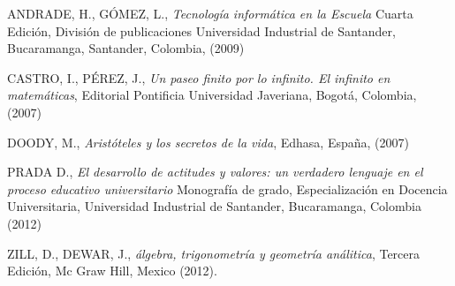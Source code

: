 \begin{titlepage}
\begin{minipage}{0.85\linewidth}
\end{minipage}
\vspace{5pt}
\begin{thebibliography}{99}
 ANDRADE, H., G\'OMEZ, L., \textit{Tecnolog\'ia inform\'atica en la Escuela}
Cuarta Edici\'on, Divisi\'on de publicaciones Universidad Industrial de
Santander, Bucaramanga, Santander, Colombia, (2009)

 CASTRO, I., P\'EREZ, J., \textit{Un paseo finito por lo infinito.  El infinito en matem\'aticas},
Editorial Pontificia Universidad Javeriana, Bogot\'a, Colombia, (2007)

 DOODY, M., \textit{Arist\'oteles y los secretos de la vida},
Edhasa, Espa\~na, (2007)

 PRADA D., \textit{El desarrollo de actitudes y valores: un verdadero lenguaje en el proceso educativo universitario}
Monograf\'ia de grado, Especializaci\'on en Docencia Universitaria,
Universidad Industrial de Santander, Bucaramanga, Colombia (2012)

 ZILL, D., DEWAR, J., \textit{\'algebra, trigonometr\'ia y geometr\'ia an\'alitica},
Tercera Edici\'on, Mc Graw Hill, Mexico (2012).


\end{thebibliography}
\end{titlepage}
\author{%
\vspace{2pt}\\
 Teovaldo Garcia ,\vspace{2pt} \\
   Universidad Popular Del Cesar,\vspace{2pt} \\
    \hspace*{-2cm}\texttt{\scriptsize teovaldogarcia@unicesar.edu.co}\vspace{20pt} \\
    Hamilton Garcia,\vspace{2pt} \\
  Universidad Popular Del Cesar,\vspace{2pt} \\
    \hspace*{-2cm}\texttt{\scriptsize hamiltongarcia@unicesar.edu.co}\vspace{20pt} \\
         }
